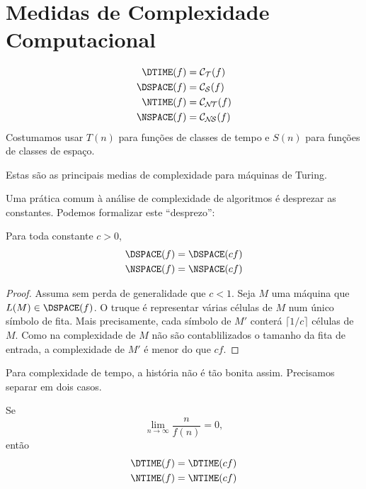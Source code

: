 \section{Medidas de Complexidade Computacional}
\label{medidas_padrao}

\begin{definition}
    \begin{align*}
        \DTIME(f) &= \mathcal C_\PhiDT(f) \\
        \DSPACE(f) &= \mathcal C_\PhiDS(f) \\
        \NTIME(f) &= \mathcal C_\PhiNT(f) \\
        \NSPACE(f) &= \mathcal C_\PhiNS(f)
    \end{align*}
    Costumamos usar $T(n)$ para funções de classes de tempo
    e $S(n)$ para funções de classes de espaço.
\end{definition}

Estas são as principais medias de complexidade
para máquinas de Turing.

Uma prática comum à análise de complexidade de algoritmos
é desprezar as constantes. Podemos formalizar este ``desprezo'':

\begin{theorem}
    Para toda constante $c > 0$,
    \begin{align*}
        \DSPACE(f) & = \DSPACE(cf) \\
        \NSPACE(f) & = \NSPACE(cf)
    \end{align*}
\end{theorem}

\begin{proof}
    Assuma sem perda de generalidade que $c < 1$.
    Seja $M$ uma máquina que $L(M) \in \DSPACE(f)$.
    O truque é representar várias células de $M$
    num único símbolo de fita.
    Mais precisamente,
    cada símbolo de $M'$ conterá
    $\lceil 1/c \rceil$ células de $M$.
    Como na complexidade de $M$
    não são contablilizados o tamanho da fita de entrada,
    a complexidade de $M'$ é menor do que $cf$.
\end{proof}

Para complexidade de tempo,
a história não é tão bonita assim.
Precisamos separar em dois casos.

\begin{theorem}
    Se
    \begin{equation*}
        \lim_{n \rightarrow \infty} \frac{n}{f(n)} = 0,
    \end{equation*}
    então
    \begin{align*}
        \DTIME(f) &= \DTIME(cf) \\
        \NTIME(f) &= \NTIME(cf)
    \end{align*}
\end{theorem}

